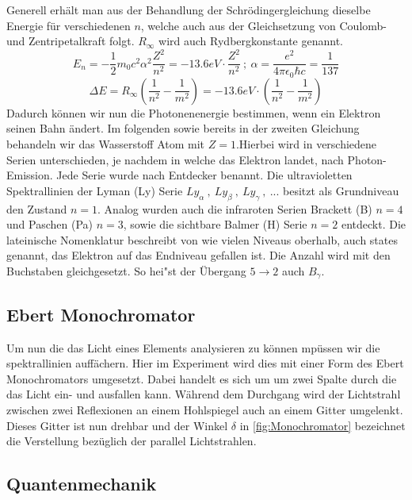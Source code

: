 \documentclass[]{article}
\begin{document}
Generell erhält man aus der Behandlung der Schrödingergleichung dieselbe Energie für verschiedenen $n$, welche auch aus der Gleichsetzung von Coulomb- und Zentripetalkraft folgt. $R_\infty$ wird auch Rydbergkonstante genannt. 
\begin{equation}
E_n = -\frac{1}{2} m_0 c^2 \alpha^2 \frac{Z^2}{n^2} = -13.6eV \cdot \frac{Z^2}{n^2} \: ; \: \alpha = \frac{e^2}{4\pi\epsilon_0 \hbar c} = \frac{1}{137}
\end{equation}
\begin{equation}
\Delta E = R_\infty \left(\frac{1}{n^2} - \frac{1}{m^2} \right)  = -13.6eV \cdot \left(\frac{1}{n^2} - \frac{1}{m^2} \right)
\end{equation}
Dadurch können wir nun die Photonenenergie bestimmen, wenn ein Elektron seinen Bahn ändert. Im folgenden sowie bereits in der zweiten Gleichung behandeln wir das Wasserstoff Atom mit $Z=1$.Hierbei wird in verschiedene Serien unterschieden, je nachdem in welche das Elektron landet, nach Photon-Emission. Jede Serie wurde nach Entdecker benannt. Die ultravioletten Spektrallinien der Lyman (Ly) Serie $Ly_\alpha \:,\: Ly_\beta \:,\: Ly_\gamma \:,\: ...$ besitzt als Grundniveau den Zustand $n=1$. Analog wurden auch die infraroten Serien Brackett (B) $n=4$ und Paschen (Pa) $n=3$, sowie die sichtbare Balmer (H) Serie $n=2$ entdeckt. 
Die lateinische Nomenklatur beschreibt von wie vielen Niveaus oberhalb, auch states genannt, das Elektron auf das Endniveau gefallen ist. Die Anzahl wird mit den Buchstaben gleichgesetzt. So hei"st der \"Ubergang $5 \rightarrow 2$ auch $B_\gamma$.

\subsection{Ebert Monochromator}
Um nun die das Licht eines Elements analysieren zu können mpüssen wir die spektrallinien auffächern. Hier im Experiment wird dies mit einer Form des Ebert Monochromators umgesetzt. Dabei handelt es sich um um zwei  Spalte durch die das Licht ein- und ausfallen kann. Während dem Durchgang wird der Lichtstrahl zwischen zwei Reflexionen an einem Hohlspiegel auch an einem Gitter umgelenkt. Dieses Gitter ist nun drehbar und der Winkel $\delta$ in \ref{fig:Monochromator} bezeichnet die Verstellung bezüglich der parallel Lichtstrahlen. 

\subsection{Quantenmechanik}
\end{document}
